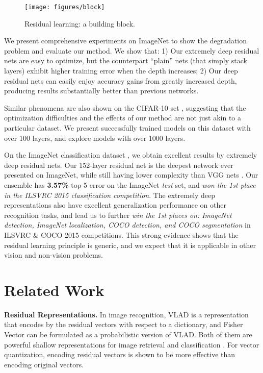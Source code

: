 \documentclass{article}
\begin{document}
\begin{figure}[t]
\centering
\hspace{48pt}
\texttt{[image: figures/block]}
\vspace{-.5em}
\caption{Residual learning: a building block.}
\label{fig:block}
\vspace{-1em}
\end{figure}

We present comprehensive experiments on ImageNet \cite{Russakovsky2014} to show the degradation problem and evaluate our method.
We show that: 1) Our extremely deep residual nets are easy to optimize, but the counterpart ``plain'' nets (that simply stack layers) exhibit higher training error when the depth increases; 2) Our deep residual nets can easily enjoy accuracy gains from greatly increased depth, producing results substantially better than previous networks.

Similar phenomena are also shown on the CIFAR-10 set \cite{Krizhevsky2009}, suggesting that the optimization difficulties and the effects of our method are not just akin to a particular dataset. We present successfully trained models on this dataset with over 100 layers, and explore models with over 1000 layers.

On the ImageNet classification dataset \cite{Russakovsky2014}, we obtain excellent results by extremely deep residual nets.
Our 152-layer residual net is the deepest network ever presented on ImageNet, while still having lower complexity than VGG nets \cite{Simonyan2015}. Our ensemble has \textbf{3.57\%} top-5 error on the ImageNet \emph{test} set, and \emph{won the 1st place in the ILSVRC 2015 classification competition}. The extremely deep representations also have excellent generalization performance on other recognition tasks, and lead us to further \emph{win the 1st places on: ImageNet detection, ImageNet localization, COCO detection, and COCO segmentation} in ILSVRC \& COCO 2015 competitions. This strong evidence shows that the residual learning principle is generic, and we expect that it is applicable in other vision and non-vision problems.


\section{Related Work}

\noindent\textbf{Residual Representations.}
In image recognition, VLAD \cite{Jegou2012} is a representation that encodes by the residual vectors with respect to a dictionary, and Fisher Vector \cite{Perronnin2007} can be formulated as a probabilistic version \cite{Jegou2012} of VLAD.
Both of them are powerful shallow representations for image retrieval and classification \cite{Chatfield2011,Vedaldi2008}.
For vector quantization, encoding residual vectors \cite{Jegou2011} is shown to be more effective than encoding original vectors.
\end{document}
